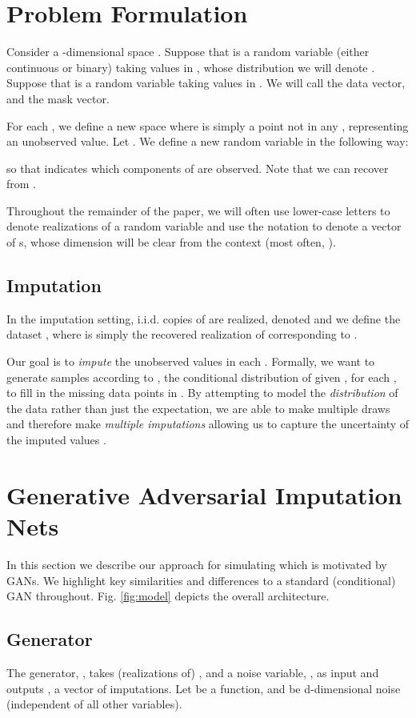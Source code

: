\documentclass{article}
\begin{document}
\section{Problem Formulation} \label{sect:problem_formulate}
Consider a -dimensional space . Suppose that  is a random variable (either continuous or binary) taking values in , whose distribution we will denote . Suppose that  is a random variable taking values in . We will call  the data vector, and  the mask vector.  

For each , we define a new space  where  is simply a point not in any , representing an unobserved value. Let .  We define a new random variable  in the following way:

so that  indicates which components of  are observed. Note that we can recover  from .

Throughout the remainder of the paper, we will often use lower-case letters to denote realizations of a random variable and use the notation  to denote a vector of s, whose dimension will be clear from the context (most often, ).

\subsection{Imputation}
In the imputation setting,  i.i.d. copies of  are realized, denoted  and we define the dataset , where  is simply the recovered realization of  corresponding to . 

Our goal is to {\em impute} the unobserved values in each . Formally, we want to generate samples according to , the conditional distribution of  given , for each , to fill in the missing data points in . By attempting to model the {\em distribution} of the data rather than just the expectation, we are able to make multiple draws and therefore make {\em multiple imputations} allowing us to capture the uncertainty of the imputed values \cite{MICE, MICE-R, Rubin}.

\section{Generative Adversarial Imputation Nets}\label{sect:gain}
In this section we describe our approach for simulating  which is motivated by GANs. We highlight key similarities and differences to a standard (conditional) GAN throughout. Fig. \ref{fig:model} depicts the overall architecture.
\subsection{Generator}
The generator, , takes (realizations of) ,  and a noise variable, , as input and outputs , a vector of imputations. Let  be a function, and  be d-dimensional noise (independent of all other variables).
\end{document}
